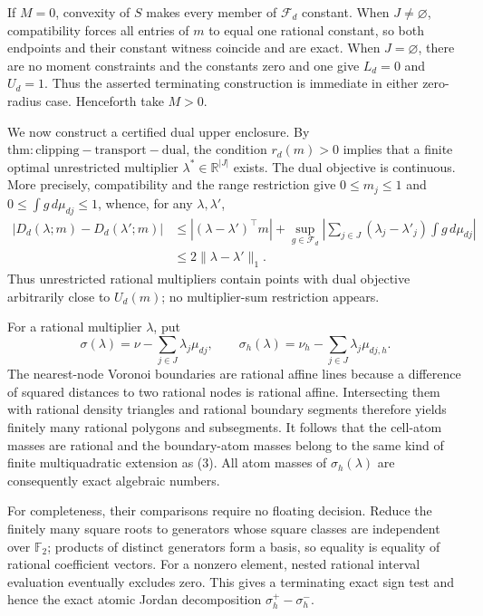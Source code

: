 If \(M=0\), convexity of \(S\) makes every member of \(\mathcal F_d\)
constant.  When \(J\neq\varnothing\), compatibility forces all entries of
\(m\) to equal one rational constant, so both endpoints and their constant
witness coincide and are exact.  When \(J=\varnothing\), there are no moment
constraints and the constants zero and one give \(L_d=0\) and \(U_d=1\).
Thus the asserted terminating construction is immediate in either zero-radius
case.  Henceforth take \(M>0\).

We now construct a certified dual upper enclosure.  By
\(\mathrm{thm:clipping-transport-dual}\), the condition \(r_d(m)>0\) implies
that a finite optimal unrestricted multiplier
\(\lambda^*\in\mathbb R^{|J|}\) exists.  The dual objective is continuous.
More precisely, compatibility and the range restriction give
\(0\leq m_j\leq1\) and \(0\leq\int g\,d\mu_{dj}\leq1\), whence, for any
\(\lambda,\lambda'\),
\begin{align}
 |D_d(\lambda;m)-D_d(\lambda';m)|
 &\leq |(\lambda-\lambda')^\top m|
   +\sup_{g\in\mathcal F_d}
       \left|\sum_{j\in J}(\lambda_j-\lambda'_j)
                    \int g\,d\mu_{dj}\right| \\
 &\leq2\|\lambda-\lambda'\|_1.                            \tag{10}
\end{align}
Thus unrestricted rational multipliers contain points with dual objective
arbitrarily close to \(U_d(m)\); no multiplier-sum restriction appears.

For a rational multiplier \(\lambda\), put
\[
 \sigma(\lambda)=\nu-\sum_{j\in J}\lambda_j\mu_{dj},
 \qquad
 \sigma_h(\lambda)=\nu_h-\sum_{j\in J}\lambda_j\mu_{dj,h}.\tag{11}
\]
The nearest-node Voronoi boundaries are rational affine lines because a
difference of squared distances to two rational nodes is rational affine.
Intersecting them with rational density triangles and rational boundary
segments therefore yields finitely many rational polygons and subsegments.
It follows that the cell-atom masses are rational and the boundary-atom masses
belong to the same kind of finite multiquadratic extension as (3).  All atom
masses of \(\sigma_h(\lambda)\) are consequently exact algebraic numbers.

For completeness, their comparisons require no floating decision.  Reduce the
finitely many square roots to generators whose square classes are independent
over \(\mathbb F_2\); products of distinct generators form a basis, so equality
is equality of rational coefficient vectors.  For a nonzero element, nested
rational interval evaluation eventually excludes zero.  This gives a
terminating exact sign test and hence the exact atomic Jordan decomposition
\(\sigma_h^+-\sigma_h^-\).

